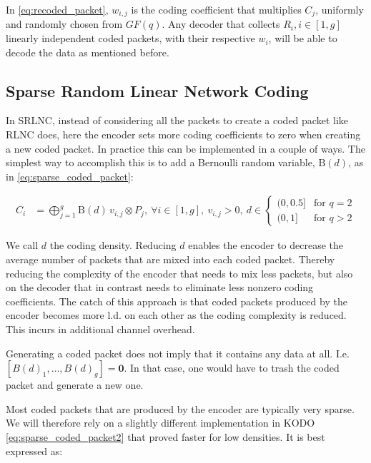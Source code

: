 In \eqref{eq:recoded_packet}, $w_{i,j}$ is the coding coefficient that
multiplies $C_j$, uniformly and randomly chosen from $GF(q)$. Any
decoder that collects $R_i, i \in [1,g]$ linearly independent coded packets,
with their respective $w_i$, will be able to decode the data as mentioned
before.

\subsection{Sparse Random Linear Network Coding}

In \ac{SRLNC}, instead of considering all the packets to create a coded
packet like \ac{RLNC} does, here the encoder sets more coding coefficients to
zero when creating a new coded packet.
In practice this can be implemented in
a couple of ways.
The simplest way to accomplish this is to add a Bernoulli random
variable, $\text{B}(d)$, as in \ref{eq:sparse_coded_packet}:

\begin{align} \label{eq:sparse_coded_packet}
    C_i  &= \bigoplus_{j=1}^{g} \text{B}(d) \, v_{i,j} \otimes P_j ,\ \forall i \in [1,g] ,\
    v_{i,j} > 0,\
    d \in
    \begin{cases}
        {(0,0.5]} & \text{for } q=2 \\
        {(0,1]} & \text{for } q>2
    \end{cases}
\end{align}

We call $d$ the coding density.
Reducing $d$ enables the encoder to decrease the average number of packets that
are mixed into each coded packet. Thereby reducing the complexity of the
encoder that needs to mix less packets, but also on the decoder that in
contrast needs to eliminate less nonzero coding coefficients. The catch of this
approach is that coded packets produced by the encoder becomes more \ac{l.d.}
on each other as the coding complexity is reduced. This incurs in additional
channel overhead.

Generating a coded packet does not imply that it contains any data at all. I.e.
$ \left[ B(d)_{1}, \ldots, B(d)_{g} \right] = \mathbf{0}$.
In that case, one would have to trash the coded packet and generate a new one.

Most coded packets that are produced by the encoder are typically very sparse.
We will therefore rely on a slightly different implementation in KODO
\ref{eq:sparse_coded_packet2} that proved faster for low densities. It is best
expressed as:

